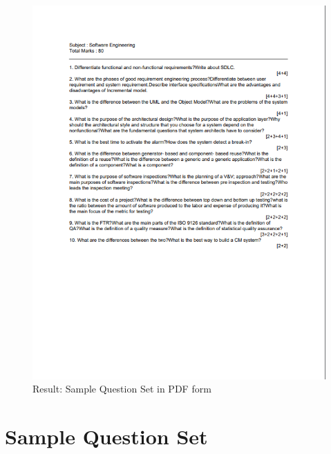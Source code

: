 \documentclass[12pt]{report}
\begin{document}
\begin{figure}[ht!]
    \centering
    \includegraphics[scale = 1]{Images/generatedQuestionSet1.png}
    \captionsetup{justification=centering} 
    \caption{Result: Sample Question Set in PDF form}
\end{figure}
\section{Sample Question Set}
\pagebreak

\end{document}
